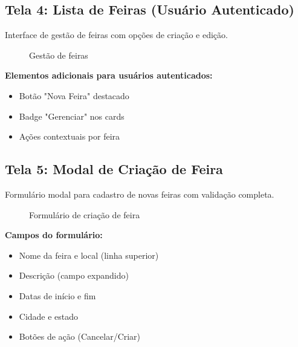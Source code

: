 \documentclass[12pt,a4paper]{article}
\begin{document}
\subsection{Tela 4: Lista de Feiras (Usuário Autenticado)}

Interface de gestão de feiras com opções de criação e edição.

\begin{figure}[H]
\centering
{}
\caption{Gestão de feiras}
\label{fig:gestao_feiras}
\end{figure}

\textbf{Elementos adicionais para usuários autenticados:}
\begin{itemize}
    \item Botão "Nova Feira" destacado
    \item Badge "Gerenciar" nos cards
    \item Ações contextuais por feira
\end{itemize}

\subsection{Tela 5: Modal de Criação de Feira}

Formulário modal para cadastro de novas feiras com validação completa.

\begin{figure}[H]
\centering
{}
\caption{Formulário de criação de feira}
\label{fig:criar_feira}
\end{figure}

\textbf{Campos do formulário:}
\begin{itemize}
    \item Nome da feira e local (linha superior)
    \item Descrição (campo expandido)
    \item Datas de início e fim
    \item Cidade e estado
    \item Botões de ação (Cancelar/Criar)
\end{itemize}
\end{document}
